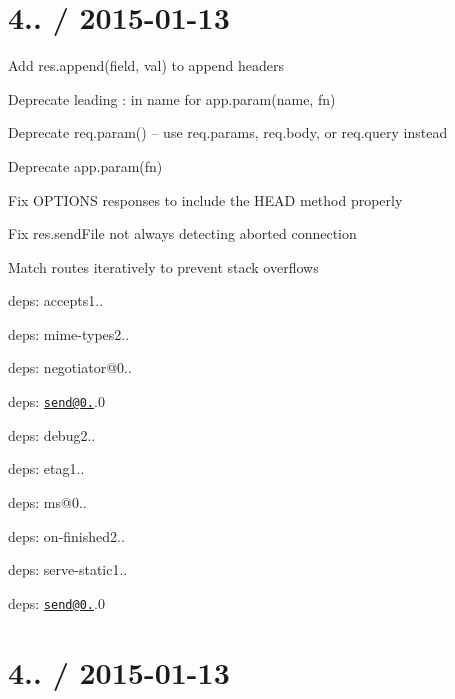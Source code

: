 {\ttfamily \section*{4.. / 2015-\/01-\/13 }}

{\ttfamily }

{\ttfamily 
\begin{DoxyItemize}
\item Add {\ttfamily res.\+append(field, val)} to append headers
\item Deprecate leading {\ttfamily \+:} in {\ttfamily name} for {\ttfamily app.\+param(name, fn)}
\item Deprecate {\ttfamily req.\+param()} -- use {\ttfamily req.\+params}, {\ttfamily req.\+body}, or {\ttfamily req.\+query} instead
\item Deprecate {\ttfamily app.\+param(fn)}
\item Fix {\ttfamily O\+P\+T\+I\+O\+NS} responses to include the {\ttfamily H\+E\+AD} method properly
\item Fix {\ttfamily res.\+send\+File} not always detecting aborted connection
\item Match routes iteratively to prevent stack overflows
\item deps\+: accepts1..
\begin{DoxyItemize}
\item deps\+: mime-\/types2..
\item deps\+: negotiator@0..
\end{DoxyItemize}
\item deps\+: \href{mailto:send@0.11}{\tt send@0.}.0
\begin{DoxyItemize}
\item deps\+: debug2..
\item deps\+: etag1..
\item deps\+: ms@0..
\item deps\+: on-\/finished2..
\end{DoxyItemize}
\item deps\+: serve-\/static1..
\begin{DoxyItemize}
\item deps\+: \href{mailto:send@0.11}{\tt send@0.}.0
\end{DoxyItemize}
\end{DoxyItemize}}

{\ttfamily \section*{4.. / 2015-\/01-\/13 }}

